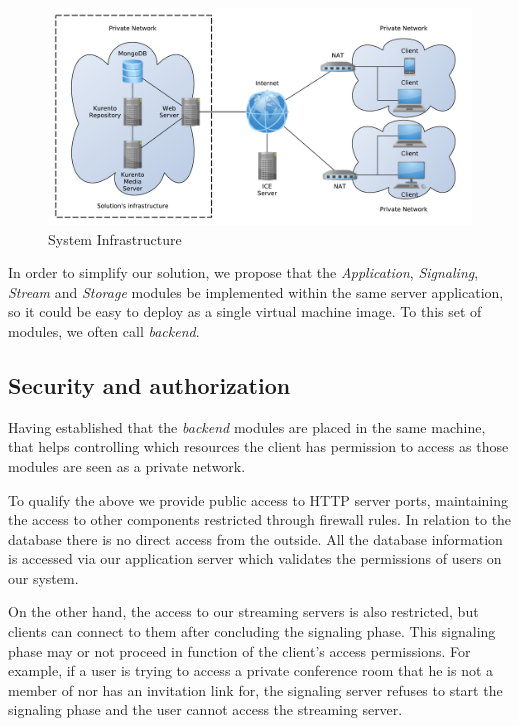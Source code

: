 
\begin{figure}[H]
	\centering
	\includegraphics[width=\textwidth]{figures/infrastructure.pdf}
	\caption{System Infrastructure}
\end{figure}

In order to simplify our solution, we propose that the \emph{Application}, \emph{Signaling}, \emph{Stream} and \emph{Storage} modules be implemented within the same server application, so it could be easy to deploy as a single virtual machine image. To this set of modules, we often call \emph{backend}.

	\subsection{Security and authorization}

Having established that the \emph{backend} modules are placed in the same machine, that helps controlling which resources the client has permission to access as those modules are seen as a private network.

To qualify the above we provide public access to \ac{HTTP} server ports, maintaining the access to other components restricted through firewall rules.
In relation to the database there is no direct access from the outside. All the database information is accessed via our application server which validates the permissions of users on our system.

On the other hand, the access to our streaming servers is also restricted, but clients can connect to them after concluding the signaling phase. This signaling phase may or not proceed in function of the client's access permissions. For example, if a user is trying to access a private conference room that he is not a member of nor has an invitation link for, the signaling server refuses to start the signaling phase and the user cannot access the streaming server.


